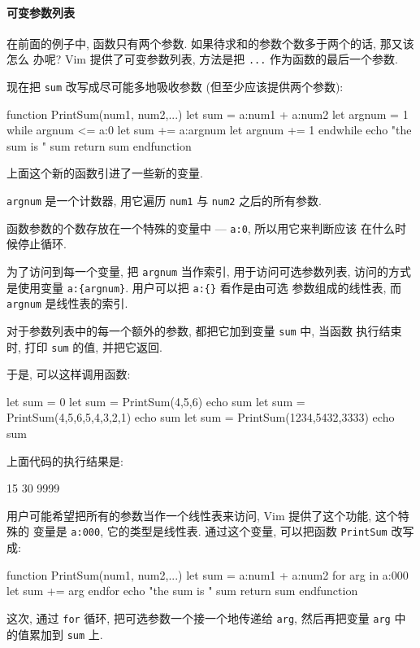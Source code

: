 \paragraph{可变参数列表}
\label{para:variable_argument_list}

在前面的例子中, 函数只有两个参数. 如果待求和的参数个数多于两个的话, 那又该怎么
办呢? Vim 提供了可变参数列表, 方法是把 \texttt{...} 作为函数的最后一个参数.

现在把 \texttt{sum} 改写成尽可能多地吸收参数 (但至少应该提供两个参数):
\begin{vimcode}
function PrintSum(num1, num2,...)
    let sum = a:num1 + a:num2
    let argnum = 1
    while argnum <= a:0
        let sum += a:{argnum}
        let argnum += 1
    endwhile
    echo "the sum is " sum
    return sum
endfunction
\end{vimcode}
上面这个新的函数引进了一些新的变量.

\texttt{argnum} 是一个计数器, 用它遍历 \texttt{num1} 与 \texttt{num2}
之后的所有参数.

函数参数的个数存放在一个特殊的变量中 --- \texttt{a:0}, 所以用它来判断应该
在什么时候停止循环.

为了访问到每一个变量, 把 \texttt{argnum} 当作索引, 用于访问可选参数列表,
访问的方式是使用变量 \verb'a:{argnum}'. 用户可以把 \verb'a:{}' 看作是由可选
参数组成的线性表, 而 \texttt{argnum} 是线性表的索引.

对于参数列表中的每一个额外的参数, 都把它加到变量 \texttt{sum} 中, 当函数
执行结束时, 打印 \texttt{sum} 的值, 并把它返回.

于是, 可以这样调用函数:
\begin{vimcode}
let sum = 0
let sum = PrintSum(4,5,6)
echo sum
let sum = PrintSum(4,5,6,5,4,3,2,1)
echo sum
let sum = PrintSum(1234,5432,3333)
echo sum
\end{vimcode}
上面代码的执行结果是:
\begin{vimcode}
15
30
9999
\end{vimcode}

用户可能希望把所有的参数当作一个线性表来访问, Vim 提供了这个功能, 这个特殊的
变量是 \texttt{a:000}, 它的类型是线性表. 通过这个变量, 可以把函数
\texttt{PrintSum} 改写成:
\begin{vimcode}
function PrintSum(num1, num2,...)
    let sum = a:num1 + a:num2
    for arg in a:000
        let sum += arg
    endfor
    echo "the sum is " sum
    return sum
endfunction
\end{vimcode}
这次, 通过 \texttt{for} 循环, 把可选参数一个接一个地传递给 \texttt{arg},
然后再把变量 \texttt{arg} 中的值累加到 \texttt{sum} 上.

